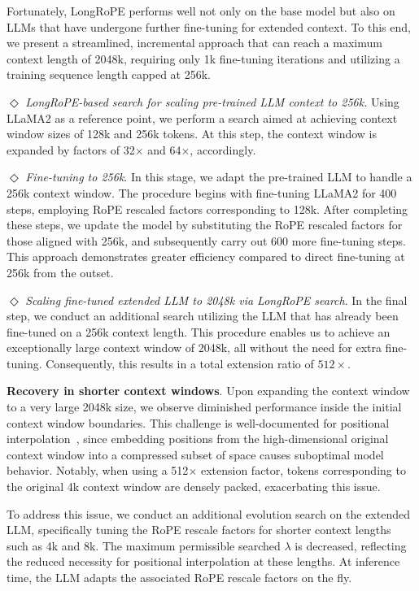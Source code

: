 Fortunately, LongRoPE performs well not only on the base model but also on LLMs that have undergone further fine-tuning for extended context. To this end, we present a streamlined, incremental approach that can reach a maximum context length of 2048k, requiring only 1k fine-tuning iterations and utilizing a training sequence length capped at 256k.

$\Diamond$ \textit{LongRoPE-based search for scaling pre-trained LLM context to 256k.} Using LLaMA2 as a reference point, we perform a search aimed at achieving context window sizes of 128k and 256k tokens. At this step, the context window is expanded by factors of 32$\times$ and 64$\times$, accordingly.

$\Diamond$ \textit{Fine-tuning to 256k}. In this stage, we adapt the pre-trained LLM to handle a 256k context window. The procedure begins with fine-tuning LLaMA2 for 400 steps, employing RoPE rescaled factors corresponding to 128k. After completing these steps, we update the model by substituting the RoPE rescaled factors for those aligned with 256k, and subsequently carry out 600 more fine-tuning steps. This approach demonstrates greater efficiency compared to direct fine-tuning at 256k from the outset.

$\Diamond$ \textit{Scaling fine-tuned extended LLM to 2048k via LongRoPE search}. In the final step, we conduct an additional search utilizing the LLM that has already been fine-tuned on a 256k context length. This procedure enables us to achieve an exceptionally large context window of 2048k, all without the need for extra fine-tuning. Consequently, this results in a total extension ratio of $512\times$.

\textbf{Recovery in shorter context windows}. Upon expanding the context window to a very large 2048k size, we observe diminished performance inside the initial context window boundaries. This challenge is well-documented for positional interpolation~\cite{pi}, since embedding positions from the high-dimensional original context window into a compressed subset of space causes suboptimal model behavior. Notably, when using a 512$\times$ extension factor, tokens corresponding to the original 4k context window are densely packed, exacerbating this issue.

To address this issue, we conduct an additional evolution search on the extended LLM, specifically tuning the RoPE rescale factors for shorter context lengths such as 4k and 8k. The maximum permissible searched $\lambda$ is decreased, reflecting the reduced necessity for positional interpolation at these lengths. At inference time, the LLM adapts the associated RoPE rescale factors on the fly.

